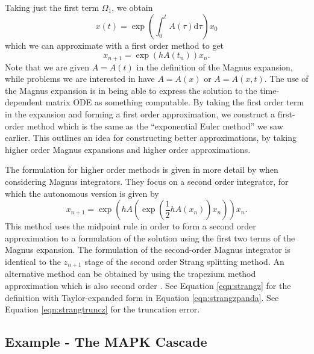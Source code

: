 Taking just the first term $\Omega_1$, we obtain
\begin{equation*}
    x(t) = \exp\left( \int_{0}^{t} A(\tau) \mathrm{d}\tau \right)x_0
\end{equation*}
which we can approximate with a first order method to get
\begin{equation*}
    x_{n+1} = \exp\left( h A(t_n) \right)x_n.
\end{equation*}
Note that we are given $A = A(t)$ in the definition of the Magnus expansion,
while problems we are interested in have $A=A(x)$ or $A=A(x,t)$.
The use of the Magnus expansion is in being able to express the solution to the time-dependent matrix ODE as something computable.
By taking the first order term in the expansion and forming a first order approximation, we construct a first-order method which is the same as the ``exponential Euler method''  we saw earlier.
This outlines an idea for constructing better approximations, by taking higher order Magnus expansions and higher order approximations.


The formulation for higher order methods is given in more detail by \cite{blanes_pos_2022} when considering Magnus integrators.
They focus on a second order integrator, for which the autonomous version is given by
\begin{equation}
    x_{n+1} = \exp\left(h A \left( \exp\left(\frac{1}{2}h A(x_n)\right) x_n \right) \right) x_n.
    \label{eqn:secondordermagnus}
\end{equation}
This method uses the midpoint rule in order to form a second order approximation to a formulation of the solution using the first two terms of the Magnus expansion. 
The formulation of the second-order Magnus integrator is identical to the $z_{n+1}$ stage of the second order Strang splitting method.
An alternative method can be obtained by using the trapezium method approximation which is also second order \cite{blanes_pos_2022}.
See Equation \ref{eqn:strangz} for the definition with Taylor-expanded form in Equation \ref{eqn:strangzpanda}.
See Equation \ref{eqn:strangtruncz} for the truncation error.

\subsection{Example - The MAPK Cascade}

